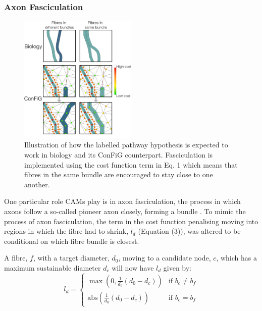 \subsubsection{Axon Fasciculation}
\label{sec:config_fasciculation}

\begin{figure}
  \centering
  \includegraphics[width=0.5\textwidth]{figures/config/biological_fasciculate.png}
  \caption[Illustraction of the fasciculation process]{Illustration of how the labelled pathway hypothesis is expected to work in biology and its ConFiG counterpart. Fasciculation is implemented using the cost function term in Eq. 1 which means that fibres in the same bundle are encouraged to stay close to one another.}
  \label{fig:config_fasciculation}
\end{figure}

One particular role CAMs play is in axon fasciculation, the process in which axons follow a so-called pioneer axon closely, forming a bundle \cite{Price2017,Sakisaka2005}. To mimic the process of axon fasciculation, the term in the cost function penalising moving into regions in which the fibre had to shrink, $l_d$ (Equation (3)), was altered to be conditional on which fibre bundle is closest.

A fibre, $f$, with a target diameter, $d_0$, moving to a candidate node, $c$, which has a maximum sustainable diameter $d_c$ will now have $l_d$ given by:
\begin{equation}
  \label{eq:updated_ld}
  l_d = \begin{cases}
    \max\left(0, \frac{1}{d_0} \left(d_0 - d_c\right)\right) & \text{if } b_c \neq b_f \\
    \mathrm{abs}\left(\frac{1}{d_0} \left(d_0 - d_c\right)\right) & \text{if } b_c = b_f
    \end{cases}
\end{equation}

